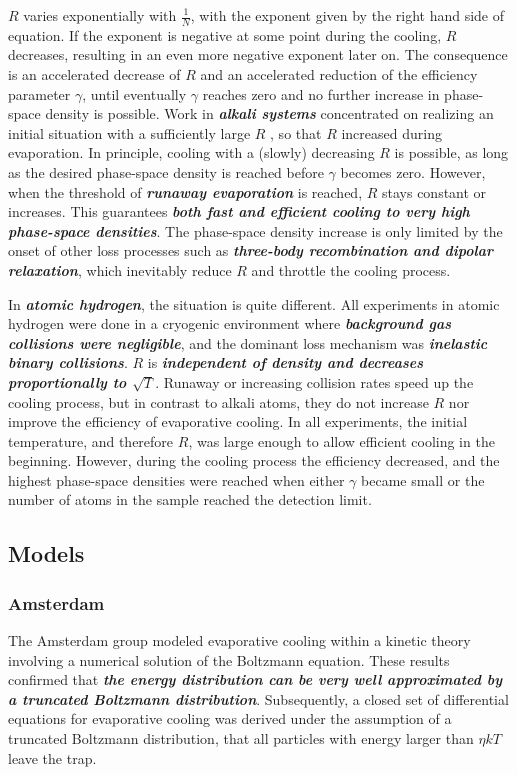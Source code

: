 \documentclass[12]{article}
\begin{document}
$R$ varies exponentially with $\frac{1}{N}$, with the exponent given by the right hand side of equation. If the exponent is negative at some point during the cooling,  $R$ decreases, resulting in an even more negative exponent later on.  The consequence is an accelerated decrease of $R$ and an accelerated reduction of the efficiency parameter $\gamma$, until eventually $\gamma$ reaches zero and no further increase in phase-space density is possible. Work in \textbf{\textit{alkali systems}} concentrated on realizing an initial situation with a sufficiently large $R$ , so that $R$ increased during evaporation. In principle, cooling with a (slowly) decreasing $R$ is possible, as long as the desired phase-space density is reached before $\gamma$ becomes zero. However, when the threshold of \textbf{\textit{runaway evaporation}} is reached, $R$ stays constant or increases. This guarantees \textbf{\textit{both fast and efficient cooling to very high phase-space densities}}. The phase-space density increase is only limited by the onset of other loss processes such as \textbf{\textit{three-body recombination and dipolar relaxation}}, which inevitably reduce $R$ and throttle the cooling process. 

In \textbf{\textit{atomic hydrogen}}, the situation is quite different. All experiments in atomic hydrogen were done in a cryogenic environment where \textbf{\textit{background gas collisions were negligible}}, and the dominant loss mechanism was \textbf{\textit{inelastic binary collisions}}. $R$ is \textbf{\textit{independent of density and decreases proportionally to $\sqrt{T}$}}. Runaway or increasing collision rates speed up the cooling process, but in contrast to alkali atoms, they do not increase $R$ nor improve the efficiency of evaporative cooling. In all experiments, the initial temperature, and therefore $R$, was large enough to allow efficient cooling in the beginning. However, during the cooling process the efficiency decreased, and the highest phase-space densities were reached when either $\gamma$ became small or the number of atoms in the sample reached the detection limit.

 \subsection{Models}
 \subsubsection{Amsterdam}
 The Amsterdam group modeled evaporative cooling within a kinetic theory involving a numerical solution of the Boltzmann equation. These results confirmed that \textbf{\textit{the energy distribution can be very well approximated by a truncated Boltzmann distribution}}.  Subsequently, a closed set of differential equations for evaporative cooling was derived under the assumption of a truncated Boltzmann distribution, that all particles with energy larger than $\eta kT$ leave the trap.       
\end{document}
